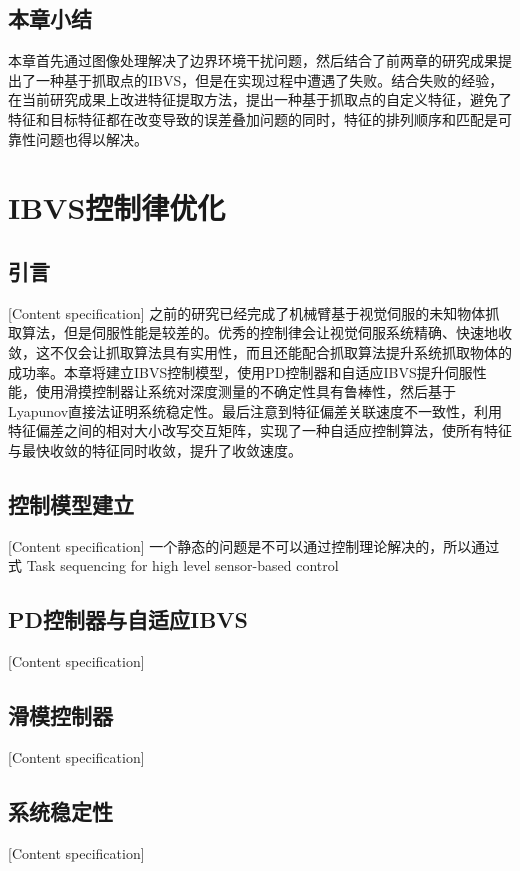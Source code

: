 \documentclass[fontset=fandol,type=bachelor,campus=harbin]{hithesisbook}
\begin{document}
\section{本章小结}
本章首先通过图像处理解决了边界环境干扰问题，然后结合了前两章的研究成果提出了一种基于抓取点的IBVS，但是在实现过程中遭遇了失败。结合失败的经验，在当前研究成果上改进特征提取方法，提出一种基于抓取点的自定义特征，避免了特征和目标特征都在改变导致的误差叠加问题的同时，特征的排列顺序和匹配是可靠性问题也得以解决。



\chapter[IBVS控制律优化]{IBVS控制律优化}
\section{引言}[Content specification]
之前的研究已经完成了机械臂基于视觉伺服的未知物体抓取算法，但是伺服性能是较差的。优秀的控制律会让视觉伺服系统精确、快速地收敛，这不仅会让抓取算法具有实用性，而且还能配合抓取算法提升系统抓取物体的成功率。本章将建立IBVS控制模型，使用PD控制器和自适应IBVS提升伺服性能，使用滑摸控制器让系统对深度测量的不确定性具有鲁棒性，然后基于Lyapunov直接法证明系统稳定性。最后注意到特征偏差关联速度不一致性，利用特征偏差之间的相对大小改写交互矩阵，实现了一种自适应控制算法，使所有特征与最快收敛的特征同时收敛，提升了收敛速度。
\section{控制模型建立}[Content specification]
一个静态的问题是不可以通过控制理论解决的，所以通过式
 Task sequencing for high level sensor-based control
\section{PD控制器与自适应IBVS}[Content specification]

\section{滑模控制器}[Content specification]

\section{系统稳定性}[Content specification]
\end{document}
